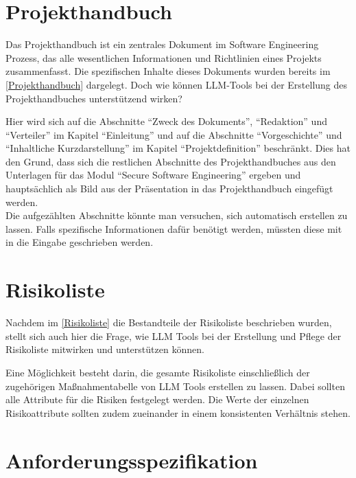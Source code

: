 \section{Projekthandbuch}  \label{LLMProjekthandbuch}

Das Projekthandbuch ist ein zentrales Dokument im Software Engineering Prozess, das alle wesentlichen Informationen und 
Richtlinien eines Projekts zusammenfasst. Die spezifischen Inhalte dieses Dokuments wurden bereits im 
\autoref{Projekthandbuch} dargelegt. Doch wie können LLM-Tools bei der Erstellung des 
Projekthandbuches unterstützend wirken?

Hier wird sich auf die Abschnitte ``Zweck des Dokuments'', ``Redaktion'' und ``Verteiler'' im Kapitel ``Einleitung''
und auf die Abschnitte ``Vorgeschichte'' und ``Inhaltliche Kurzdarstellung'' im Kapitel ``Projektdefinition'' beschränkt. 
Dies hat den Grund, dass sich die restlichen Abschnitte des Projekthandbuches aus den Unterlagen für das Modul ``Secure Software 
Engineering'' ergeben und hauptsächlich als Bild aus der Präsentation in das Projekthandbuch eingefügt werden.\\
Die aufgezählten Abschnitte könnte man versuchen, sich automatisch erstellen zu lassen. Falls spezifische Informationen 
dafür benötigt werden, müssten diese mit in die Eingabe geschrieben werden.

\section{Risikoliste}  \label{LLMRisikoliste}

Nachdem im \autoref{Risikoliste} die Bestandteile der Risikoliste beschrieben wurden, stellt sich auch hier die Frage, 
wie LLM Tools bei der Erstellung und Pflege der Risikoliste mitwirken und unterstützen können.

Eine Möglichkeit besteht darin, die gesamte Risikoliste einschließlich der zugehörigen Maßnahmentabelle von 
LLM Tools erstellen zu lassen. Dabei sollten alle Attribute für die Risiken festgelegt werden. Die Werte der einzelnen 
Risikoattribute sollten zudem zueinander in einem konsistenten Verhältnis stehen.


\section{Anforderungsspezifikation}  \label{LLMAnforderungsspezifikation}

